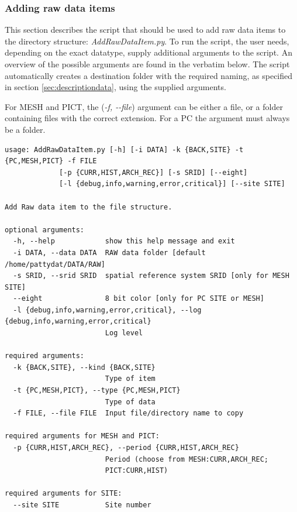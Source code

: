 \subsubsection{Adding raw data items}
\label{sec:addraw}
This section describes the script that should be used to add raw data items to the directory structure: \textit{AddRawDataItem.py}. To run the script, the user needs, depending on the exact datatype, supply additional arguments to the script. An overview of the possible arguments are found in the verbatim below. The script automatically creates a destination folder with the required naming, as specified in section \ref{sec:descriptiondata}, using the supplied arguments.

For MESH and PICT, the (\textit{-f, -\hspace{0cm}-file}) argument can be either a file, or a folder containing files with the correct extension. For a PC the argument must always be a folder.

\begin{Verbatim}[fontfamily=courier,commandchars=\\\{\},fontsize=\footnotesize]
 usage: AddRawDataItem.py [-h] [-i DATA] -k {BACK,SITE} -t {PC,MESH,PICT} -f FILE                                                                                                     
             [-p {CURR,HIST,ARCH_REC}] [-s SRID] [--eight]
             [-l {debug,info,warning,error,critical}] [--site SITE]

Add Raw data item to the file structure.

optional arguments:
  -h, --help            show this help message and exit
  -i DATA, --data DATA  RAW data folder [default /home/pattydat/DATA/RAW]
  -s SRID, --srid SRID  spatial reference system SRID [only for MESH SITE]
  --eight               8 bit color [only for PC SITE or MESH]
  -l {debug,info,warning,error,critical}, --log {debug,info,warning,error,critical}
                        Log level

required arguments:
  -k {BACK,SITE}, --kind {BACK,SITE}
                        Type of item
  -t {PC,MESH,PICT}, --type {PC,MESH,PICT}
                        Type of data
  -f FILE, --file FILE  Input file/directory name to copy

required arguments for MESH and PICT:
  -p {CURR,HIST,ARCH_REC}, --period {CURR,HIST,ARCH_REC}
                        Period (choose from MESH:CURR,ARCH_REC;
                        PICT:CURR,HIST)

required arguments for SITE:
  --site SITE           Site number
\end{Verbatim}

